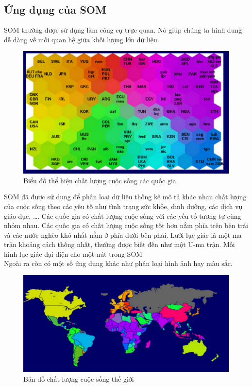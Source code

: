 \subsection{Ứng dụng của SOM}
  SOM thường được sử dụng làm công cụ trực quan. Nó giúp chúng ta hình dung dễ
  dàng về mối quan hệ giữa khối lượng lớn dữ liệu.\\ 
\begin{figure}[h!]
	\centering
    \includegraphics[width=5in,keepaspectratio=true]{SOM_ex1.png}
    \caption{Biểu đồ thể hiện chất lượng cuộc sống các quốc gia}
\end{figure}
SOM đã được sử dụng để phân loại dữ liệu thống kê mô tả khác nhau chất lượng của
cuộc sống theo các yếu tố như tình trạng sức khỏe, dinh dưỡng, các dịch vụ giáo
dục, \ldots. Các quốc gia có chất lượng cuộc sống với các yếu tố tương tự cùng
nhóm nhau. Các quốc gia có chất lượng cuộc sống tốt hơn nằm phía trên bên trái và các nước nghèo khó nhất nằm ở phía dưới bên phải. Lưới lục giác là một ma trận khoảng cách thống nhất, thường được biết đến như một U-ma trận. Mỗi hình lục giác đại diện cho một nút trong SOM\\
Ngoài ra còn có một số ứng dụng khác như phân loại hình ảnh hay màu sắc.
\begin{figure}[h!]
	\centering
    \includegraphics[width=5in,keepaspectratio=true]{SOM_ex2.png}
    \caption{Bản đồ chất lượng cuộc sống thế giới}
\end{figure}